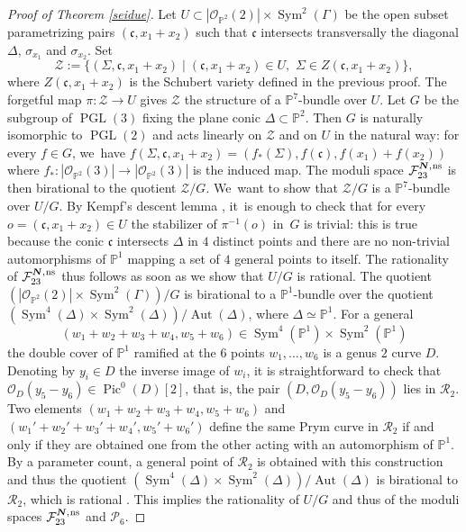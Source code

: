 \documentclass[11pt]{article}
\newcommand{\ns}{{\mkern1mu\mathrm{ns}}}
\newcommand{\bN}{\boldsymbol{N}}
\theoremstyle{plain}
\theoremstyle{definition}
\DeclareMathOperator{\Aut}{Aut}
\DeclareMathOperator{\PGL}{PGL}
\DeclareMathOperator{\Pic}{Pic}
\DeclareMathOperator{\Sym}{Sym}
\newcommand\PP{{\mathbb P}}
\newcommand\F{{\mathcal F}}
\renewcommand\P{{\mathcal P}}
\begin{document}
\begin{proof}[Proof of Theorem \ref{seidue}]
Let $U\subset |\mathcal{O}_{\PP^2}(2)|\times \Sym^2(\Gamma)$ be the open subset parametrizing pairs $(\mathfrak{c}, x_1+x_2)$ such that $\mathfrak{c}$ intersects transversally the diagonal $\Delta$, $\sigma_{x_1}$ and $\sigma_{x_2}$. Set
\[
\mathcal Z:=\bigl\{(\Sigma,\mathfrak{c}, x_1+x_2)\mid (\mathfrak{c}, x_1+x_2)\in U,\,\, \Sigma\in Z(\mathfrak{c}, x_1+x_2) \bigr\},
\]
where $Z(\mathfrak{c}, x_1+x_2)$ is the Schubert variety defined in the previous proof. The forgetful map $\pi:\mathcal Z\to U$ gives $\mathcal Z$ the structure of a $\PP^7$-bundle over $U$. Let $G$ be the subgroup of $\PGL(3)$ fixing the plane conic $\Delta\subset \PP^2$. Then $G$ is naturally isomorphic to $\PGL(2)$ and acts linearly on $\mathcal Z$ and on $U$ in the natural way: for every $f\in G$, we~have $f(\Sigma,\mathfrak{c}, x_1+x_2)=(f_*(\Sigma),f(\mathfrak{c}), f(x_1)+f(x_2))$ where $f_*:|\mathcal{O}_{\PP^2}(3)|\to |\mathcal{O}_{\PP^2}(3)|$ is the induced map. The moduli space $\F_{23}^{\bN,\ns}$ is then birational to the quotient $\mathcal Z / G$. We~want to show that $\mathcal Z / G$ is a $\PP^7$-bundle over $U/G$. By
Kempf's descent lemma \cite{DN}, it~is enough to check that for every $o=(\mathfrak{c}, x_1+x_2)\in U$ the stabilizer of $\pi^{-1}(o)$ in~$G$ is trivial: this is true because the conic $\mathfrak{c}$ intersects $\Delta$ in $4$ distinct points and there are no non-trivial automorphisms of $\PP^1$ mapping a set of $4$ general points to itself. The rationality of $\F_{23}^{\bN,\ns}$ thus follows as soon as we show that $U/G$ is rational. The quotient $(|\mathcal{O}_{\PP^2}(2)|\times \Sym^2(\Gamma))/G$ is birational to a $\PP^1$-bundle over the quotient $\left(\Sym^4(\Delta)\times \Sym^2(\Delta)\right)/\Aut(\Delta)$, where $\Delta\simeq \PP^1$. For a general
\[
(w_1+w_2+w_3+w_4,w_5+w_6)\in\Sym^4(\PP^1)\times \Sym^2(\PP^1)
\]
the double cover of $\PP^1$ ramified at the $6$ points $w_1,\ldots,w_6$ is a genus $2$ curve $D$. Denoting by $y_i\in D$ the inverse image of $w_i$, it is straightforward to check that $\mathcal O_D(y_5- y_6)\in \Pic^0(D)[2]$, that is, the pair $(D,\mathcal O_D(y_5-y_6))$ lies in $\mathcal R_2$. Two elements $(w_1+w_2+w_3+w_4,w_5+w_6)$ and $(w_1'+w_2'+w_3'+w_4',w_5'+w_6')$ define the same Prym curve in $\mathcal R_2$ if and only if they are obtained one from the other acting with an automorphism of $\PP^1$. By a parameter count, a general point of $\mathcal R_2$ is obtained with this construction and thus the quotient $\left(\Sym^4(\Delta)\times \Sym^2(\Delta)\right)/\Aut(\Delta)$ is birational to $\mathcal R_2$, which is rational \cite{Do}. This implies the rationality of $U/G$ and thus of the moduli spaces $\F_{23}^{\bN,\ns}$ and $\P_{6}$.


\end{proof}
\end{document}
